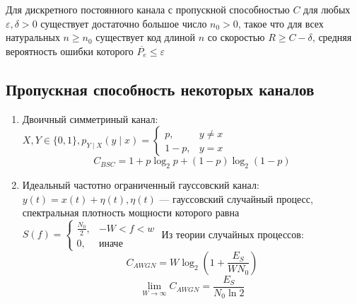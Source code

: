 \begin{theorem}[прямая]
    Для дискретного постоянного канала с пропускной способностью \(C\) для любых \(\varepsilon, \delta > 0\) существует достаточно большое число \(n_0 > 0\), такое что для всех натуральных \(n \ge n_0\) существует код длиной \(n\) со скоростью \(R \ge C - \delta\), средняя вероятность ошибки которого \(\overline{P_e} \le \varepsilon\)
\end{theorem}

\subsection{Пропускная способность некоторых каналов}

\begin{enumerate}
    \item Двоичный симметриный канал: \(X, Y \in \{0, 1\}, p_{Y \mid X}(y \mid x) = \begin{cases}
              p,      & y \neq x \\
              1 - p , & y = x
          \end{cases}\)
          \[C_{BSC} = 1 + p \log_2 p + (1 - p) \log_2(1 - p)\]
    \item Идеальный частотно ограниченный гауссовский канал: \(y(t) = x(t) + \eta(t), \eta(t)\) --- гауссовский случайный процесс, спектральная плотность мощности которого равна \(S(f) = \begin{cases}
              \frac{N_0}{2}, & -W < f < w   \\
              0,             & \text{иначе}
          \end{cases}\)
          Из теории случайных процессов:
          \[C_{AWGN} = W \log_2 \left(1 + \frac{E_S}{WN_0}\right)\]
          \[\lim_{W \to \infty} C_{AWGN} = \frac{E_S}{N_0 \ln 2}\]
\end{enumerate}

